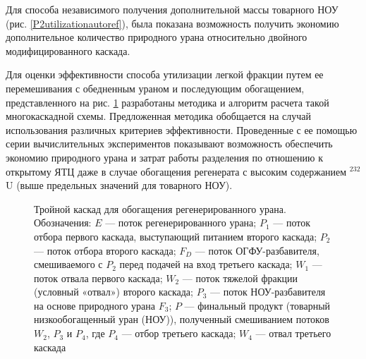 Для способа независимого получения дополнительной массы товарного НОУ (рис. \ref{P2utilizationautoref}), была показана возможность получить экономию дополнительное количество природного урана относительно двойного модифицированного каскада.

Для оценки эффективности способа утилизации легкой фракции путем ее перемешивания с обедненным ураном и последующим обогащением, представленного на рис. \ref{p2_withDepU} разработаны методика и алгоритм расчета такой многокаскадной схемы. Предложенная методика обобщается на случай использования различных критериев эффективности. Проведенные с ее помощью серии вычислительных экспериментов показывают возможность обеспечить экономию природного урана и затрат работы разделения по отношению к открытому ЯТЦ даже в случае обогащения регенерата с высоким содержанием $^{232}$U (выше предельных значений для товарного НОУ).

\begin{figure}[ht]
  \caption{Тройной каскад для обогащения регенерированного урана. Обозначения: $E$ --- поток регенерированного урана; $P_1$ --- поток отбора первого каскада, выступающий питанием второго каскада; $P_2$ --- поток отбора второго каскада; $F_{D}$ --- поток ОГФУ-разбавителя, смешиваемого с $P_2$ перед подачей на вход третьего каскада; $W_1$ --- поток отвала первого каскада; $W_2$ --- поток тяжелой фракции (условный «отвал») второго каскада; $P_3$ --- поток НОУ-разбавителя на основе природного урана $F_3$; $P$ --- финальный продукт (товарный низкообогащенный уран (НОУ)), полученный смешиванием потоков $W_2$, $P_3$ и $P_4$, где $P_4$ --- отбор третьего каскада; $W_4$ --- отвал третьего каскада}\label{p2_withDepU}
\end{figure}

